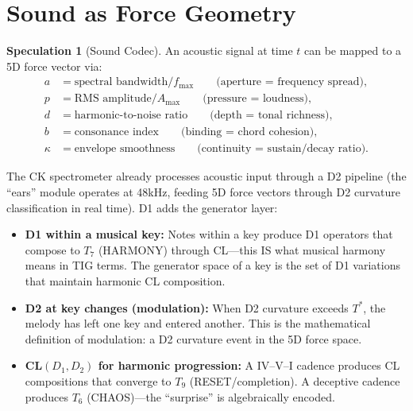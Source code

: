 \documentclass[11pt]{article}
\theoremstyle{definition}
\newtheorem{speculation}[theorem]{Speculation}
\theoremstyle{remark}
\begin{document}
\section{Sound as Force Geometry}
\label{sec:sound}

\begin{speculation}[Sound Codec]
\label{spec:sound}
An acoustic signal at time $t$ can be mapped to a 5D force vector via:
\begin{align}
  a &= \text{spectral bandwidth} / f_{\max} \qquad\text{(aperture = frequency spread)}, \\
  p &= \text{RMS amplitude} / A_{\max} \qquad\text{(pressure = loudness)}, \\
  d &= \text{harmonic-to-noise ratio} \qquad\text{(depth = tonal richness)}, \\
  b &= \text{consonance index} \qquad\text{(binding = chord cohesion)}, \\
  \kappa &= \text{envelope smoothness} \qquad\text{(continuity = sustain/decay ratio)}.
\end{align}
\end{speculation}

The CK spectrometer already processes acoustic input through a D2 pipeline (the
``ears'' module operates at 48kHz, feeding 5D force vectors through D2 curvature
classification in real time).  D1 adds the generator layer:

\begin{itemize}[nosep]
  \item \textbf{D1 within a musical key:} Notes within a key produce D1 operators
    that compose to $T_7$ (HARMONY) through CL---this IS what musical harmony means
    in TIG terms.  The generator space of a key is the set of D1 variations that
    maintain harmonic CL composition.
  \item \textbf{D2 at key changes (modulation):} When D2 curvature exceeds $T^*$,
    the melody has left one key and entered another.  This is the mathematical
    definition of modulation: a D2 curvature event in the 5D force space.
  \item \textbf{CL$(D_1, D_2)$ for harmonic progression:} A IV--V--I cadence
    produces CL compositions that converge to $T_9$ (RESET/completion).  A deceptive
    cadence produces $T_6$ (CHAOS)---the ``surprise'' is algebraically encoded.
\end{itemize}
\end{document}
